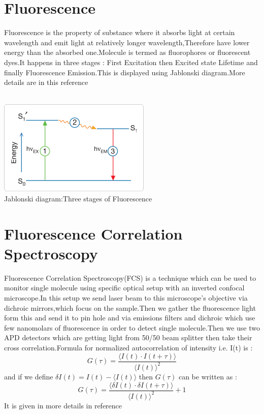 \documentclass[twoside,single]{lion-msc}
\begin{document}
\section{Fluorescence}
Fluorescence is the property of substance where it absorbs light at certain  wavelength and emit light at relatively longer wavelength,Therefore have lower energy than the absorbed one.Molecule is termed as fluorophores or fluorescent dyes.It happens in three stages : First Excitation then Excited state Lifetime and finally Fluorescence Emission.This is displayed using Jablonski diagram.More details are in this reference \cite{AuNR2} \\
\\
\begin{center}
\includegraphics[scale=1]{2.png}\\
Jablonski diagram:Three stages of Fluorescence \cite{AuNR2} 
\end{center}

\section{Fluorescence Correlation Spectroscopy}
Fluorescence Correlation Spectroscopy(FCS) is a technique which can be used to monitor single molecule using specific optical setup with an inverted confocal microscope.In this setup we send laser beam to this microscope's objective via dichroic mirrors,which focus on the sample.Then we gather the fluorescence light form this and send it to pin hole and via emissions filters and dichroic which use few nanomolars of fluorescence in order to detect single molecule.Then we use two APD detectors which are getting light from 50/50 beam splitter then take their cross correlation.Formula for normalized autocorrelation of intensity i.e. I(t) is :
$$
G(\tau) = \frac{\langle{I(t)}\cdot{I(t+\tau)}\rangle}{\langle{I(t)}\rangle^2} 
$$
and if we define $\delta{I(t)} = I(t) - \langle{I(t)}\rangle$ then $G(\tau)$ can be written as :
$$
G(\tau) = \frac{\langle\delta{I(t)}\cdot\delta{I(t+\tau)}\rangle}{\langle{I(t)}\rangle^2} +1
$$
It is given in more details in reference \cite{AuNR3}
\end{document}
